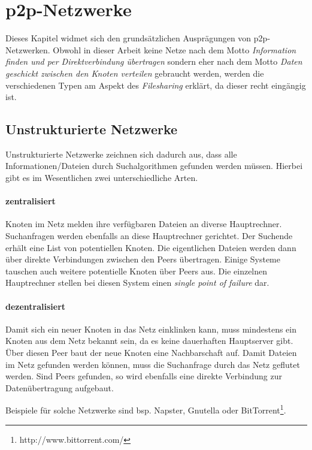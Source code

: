 
\section{p2p-Netzwerke}
Dieses Kapitel widmet sich den grundsätzlichen Ausprägungen von p2p-Netzwerken. Obwohl in dieser Arbeit keine Netze nach dem Motto \emph{Information finden und per Direktverbindung übertragen} sondern eher nach dem Motto \emph{Daten geschickt zwischen den Knoten verteilen} gebraucht werden, werden die verschiedenen Typen am Aspekt des \emph{Filesharing} erklärt, da dieser recht eingängig ist.


\subsection{Unstrukturierte Netzwerke}
Unstrukturierte Netzwerke zeichnen sich dadurch aus, dass alle Informationen/Dateien durch Suchalgorithmen gefunden werden müssen. Hierbei gibt es im Wesentlichen zwei unterschiedliche Arten.

\paragraph{zentralisiert} Knoten im Netz melden ihre verfügbaren Dateien an diverse Hauptrechner. Suchanfragen werden ebenfalls an diese Hauptrechner gerichtet. Der Suchende erhält eine List von potentiellen Knoten. Die eigentlichen Dateien werden dann über direkte Verbindungen zwischen den Peers übertragen. Einige Systeme tauschen auch weitere potentielle Knoten über Peers aus. Die einzelnen Hauptrechner stellen bei diesen System einen \emph{single point of failure} dar.

\paragraph{dezentralisiert} Damit sich ein neuer Knoten in das Netz einklinken kann, muss mindestens ein Knoten aus dem Netz bekannt sein, da es keine dauerhaften Hauptserver gibt. Über diesen Peer baut der neue Knoten eine Nachbarschaft auf. Damit Dateien im Netz gefunden werden können, muss die Suchanfrage durch das Netz geflutet werden. Sind Peers gefunden, so wird ebenfalls eine direkte Verbindung zur Datenübertragung aufgebaut.

Beispiele für solche Netzwerke sind bsp. Napster, Gnutella oder BitTorrent\footnote{http://www.bittorrent.com/}.

